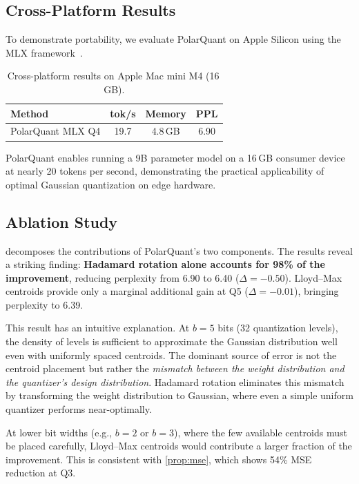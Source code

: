\documentclass[10pt,twocolumn]{article}
\begin{document}
\subsection{Cross-Platform Results}
\label{sec:crossplatform}

To demonstrate portability, we evaluate PolarQuant on Apple Silicon using the MLX framework~\cite{mlx2024}.

\begin{table}[h]
\centering
\caption{Cross-platform results on Apple Mac mini M4 (16\,GB).}
\label{tab:apple}
\small
\begin{tabular}{@{}lccc@{}}
\toprule
\textbf{Method} & \textbf{tok/s} & \textbf{Memory} & \textbf{PPL} \\
\midrule
PolarQuant MLX Q4 & 19.7 & 4.8\,GB & 6.90 \\
\bottomrule
\end{tabular}
\end{table}

PolarQuant enables running a 9B parameter model on a 16\,GB consumer device at nearly 20 tokens per second, demonstrating the practical applicability of optimal Gaussian quantization on edge hardware.

\subsection{Ablation Study}
\label{sec:ablation}

 decomposes the contributions of PolarQuant's two components. The results reveal a striking finding: \textbf{Hadamard rotation alone accounts for 98\% of the improvement}, reducing perplexity from 6.90 to 6.40 ($\Delta = -0.50$). Lloyd--Max centroids provide only a marginal additional gain at Q5 ($\Delta = -0.01$), bringing perplexity to 6.39.

This result has an intuitive explanation. At $b = 5$ bits (32 quantization levels), the density of levels is sufficient to approximate the Gaussian distribution well even with uniformly spaced centroids. The dominant source of error is not the centroid placement but rather the \emph{mismatch between the weight distribution and the quantizer's design distribution}. Hadamard rotation eliminates this mismatch by transforming the weight distribution to Gaussian, where even a simple uniform quantizer performs near-optimally.

At lower bit widths (e.g., $b = 2$ or $b = 3$), where the few available centroids must be placed carefully, Lloyd--Max centroids would contribute a larger fraction of the improvement. This is consistent with \cref{prop:mse}, which shows 54\% MSE reduction at Q3.
\end{document}
